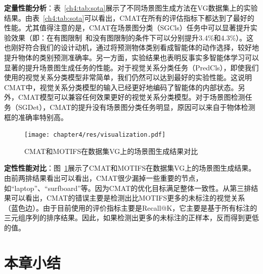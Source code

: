 \textbf{定量性能分析}：表~\ref{ch4:tab:sota}展示了不同场景图生成方法在VG数据集上的实验结果。由表~\ref{ch4:tab:sota}可以看出，CMAT在所有的评估指标下都达到了最好的性能。尤其值得注意的是，CMAT在场景图分类（SGCls）任务中可以显著提升实验效果（即：在有图限制~\cite{zellers2018neural}和没有图限制的条件下可以分别提升3.4\%和4.3\%）。这也刚好符合我们的设计动机，通过将预测物体类别看成智能体的动作选择，较好地提升物体的类别预测准确率。另一方面，实验结果也表明反事实多智能体学习可以显著的提升场景图生成任务的性能。对于视觉关系分类任务（PredCls），即使我们使用的视觉关系分类模型非常简单，我们仍然可以达到最好的实验性能。这说明CMAT中，视觉关系分类模型的输入已经更好地编码了智能体的内部状态。另外，CMAT模型可以兼容任何效果更好的视觉关系分类模型。对于场景图检测任务（SGDet），CMAT的提升没有场景图分类任务明显，原因可以来自于物体检测框的准确率特别高。


\begin{figure}[htbp]
    \centering
    \texttt{[image: chapter4/res/visualization.pdf]}
    \caption{CMAT和MOTIFS在数据集VG上的场景图生成结果对比}
    \label{ch4:fig:visualization}
\end{figure}

\textbf{定性性能对比}：图~\ref{ch4:fig:visualization}展示了CMAT和MOTIFS在数据集VG上的场景图生成结果。由前两排结果看出可以看出，CMAT很少漏掉一些重要的节点，如“laptop”、“surfboard”等。因为CMAT的优化目标满足整体一致性。从第三排结果可以看出，CMAT的错误主要是检测出比MOTIFS更多的未标注的视觉关系（蓝色边）。由于目前使用的评价指标主要是Recall@K，它主要是基于所有标注的三元组序列的排序结果。因此，如果检测出更多的未标注的正样本，反而得到更低的值。




\section{本章小结}